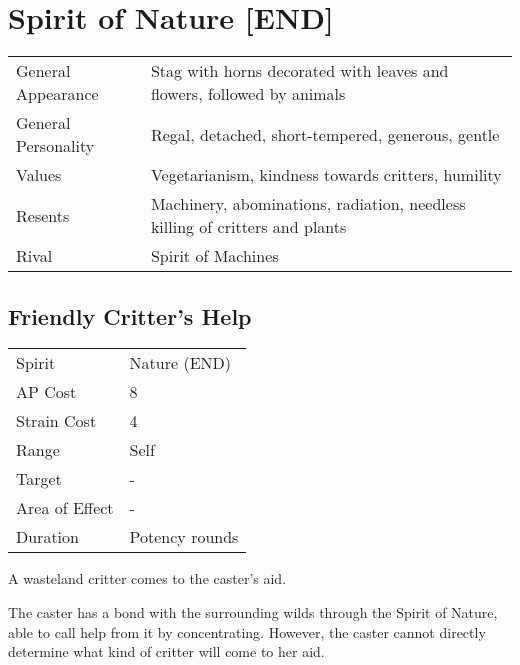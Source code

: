 \documentclass[11pt,a4paper,twocolumn]{book}
\begin{document}
\section*{Spirit of Nature [END]}
{
	\begin{tabu} to 75mm{| X[l,4] | X[l,8] |}
		\hline
		General Appearance  & Stag with horns decorated with leaves and flowers, followed by animals      \\
		General Personality & Regal, detached, short-tempered, generous, gentle                           \\
		Values              & Vegetarianism, kindness towards critters, humility                          \\
		Resents             & Machinery, abominations, radiation, needless killing of critters and plants \\
		Rival               & Spirit of Machines                                                          \\ \hline
	\end{tabu}
	
}
\medskip

\subsection*{Friendly Critter's Help}
{
	\begin{tabu} to 75mm{| X[l,4] | X[l,7] |}
		\hline
		Spirit 			& Nature (END) 		\\
		AP Cost	      	& 8						\\
		Strain Cost     & 4 					\\
		Range     		& Self 					\\
		Target      	& -						\\
		Area of Effect  & -  	 				\\
		Duration     	& Potency rounds 		\\ \hline
	\end{tabu}
	
}

\medskip

A wasteland critter comes to the caster's aid.

The caster has a bond with the surrounding wilds through the Spirit of Nature, able to call help from it by concentrating. However, the caster cannot directly determine what kind of critter will come to her aid.
\end{document}
